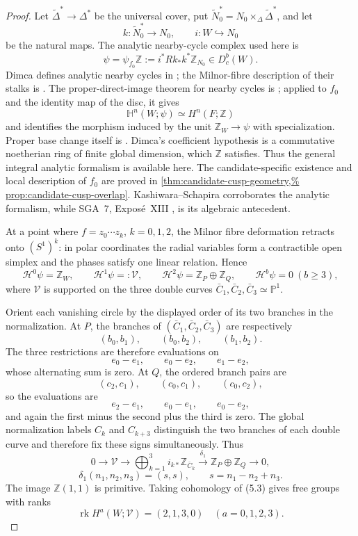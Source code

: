 \begin{proof}
Let \(\widetilde\Delta^*\to\Delta^*\) be the universal cover, put
\(\widetilde N_0^*=N_0\times_\Delta\widetilde\Delta^*\), and let
\[
 k:\widetilde N_0^*\longrightarrow N_0,
 \qquad i:W\hookrightarrow N_0
\]
be the natural maps.  The analytic nearby-cycle complex used here is
\[
 \psi=\psi_{f_0}\mathbb Z
 :=i^*Rk_*k^*\mathbb Z_{N_0}\in D_c^b(W).
\tag{5.0}
\]
Dimca defines analytic nearby cycles in
\cite[Definition~4.2.1]{Dimca2004}; the Milnor-fibre description of their
stalks is \cite[Proposition~4.2.2]{Dimca2004}.  The proper-direct-image
theorem for nearby cycles is
\cite[Proposition~4.2.11]{Dimca2004}; applied to \(f_0\) and the identity
map of the disc, it gives
\[
 \mathbb H^n(W;\psi)\simeq H^n(F;\mathbb Z)
\]
and identifies the morphism induced by the unit
\(\mathbb Z_W\to\psi\) with specialization.  Proper base change itself is
\cite[Theorem~2.3.26]{Dimca2004}.  Dimca's coefficient hypothesis is a
commutative noetherian ring of finite global dimension, which
\(\mathbb Z\) satisfies.  Thus the general integral analytic formalism is
available here.  The candidate-specific existence and local description of
\(f_0\) are proved in \cref{thm:candidate-cusp-geometry,%
prop:candidate-cusp-overlap}.  Kashiwara--Schapira
\cite[\S8.6]{KashiwaraSchapira1990}
corroborates the analytic formalism, while SGA~7, Expos\'e~XIII
\cite{SGA7II1973}, is its algebraic antecedent.

At a point where \(f=z_0\cdots z_k\), \(k=0,1,2\), the Milnor fibre
deformation retracts onto \((S^1)^k\): in polar coordinates the radial
variables form a contractible open simplex and the phases satisfy one linear
relation.  Hence
\[
 \mathcal H^0\psi=\mathbb Z_W,\qquad
 \mathcal H^1\psi=:\mathscr V,\qquad
 \mathcal H^2\psi=\mathbb Z_P\oplus\mathbb Z_Q,\qquad
 \mathcal H^b\psi=0\ (b\ge3),
\tag{5.2}
\]
where \(\mathscr V\) is supported on the three double curves
\(\bar C_1,\bar C_2,\bar C_3\simeq\mathbb P^1\).

Orient each vanishing circle by the displayed order of its two branches in
the normalization.  At \(P\), the branches of
\((\bar C_1,\bar C_2,\bar C_3)\) are respectively
\[
 (b_0,b_1),\qquad(b_0,b_2),\qquad(b_1,b_2).
\]
The three restrictions are therefore evaluations on
\[
 e_0-e_1,\qquad e_0-e_2,\qquad e_1-e_2,
\]
whose alternating sum is zero.  At \(Q\), the ordered branch pairs are
\[
 (c_2,c_1),\qquad(c_0,c_1),\qquad(c_0,c_2),
\]
so the evaluations are
\[
 e_2-e_1,\qquad e_0-e_1,\qquad e_0-e_2,
\]
and again the first minus the second plus the third is zero.  The global
normalization labels \(C_k\) and \(C_{k+3}\) distinguish the two branches
of each double curve and therefore fix these signs simultaneously.  Thus
\[
0\longrightarrow\mathscr V
\longrightarrow\bigoplus_{k=1}^3 i_{k*}\mathbb Z_{\bar C_k}
\xrightarrow{\delta_1}\mathbb Z_P\oplus\mathbb Z_Q
\longrightarrow0,
\]
\[
 \delta_1(n_1,n_2,n_3)=(s,s),\qquad s=n_1-n_2+n_3.
\tag{5.3}
\]
The image \(\mathbb Z(1,1)\) is primitive.  Taking cohomology of (5.3)
gives free groups with ranks
\[
 \operatorname{rk}H^a(W;\mathscr V)=(2,1,3,0)
 \quad(a=0,1,2,3).
\tag{5.4}
\]


\end{proof}
